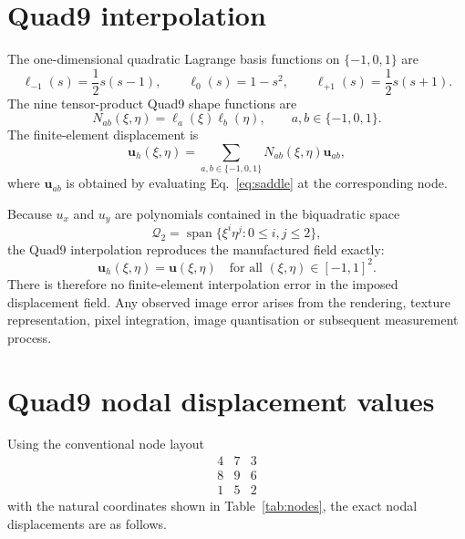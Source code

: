 \documentclass[11pt,a4paper]{article}
\newcommand{\vect}[1]{\bm{#1}}
\begin{document}
\section{Quad9 interpolation}

The one-dimensional quadratic Lagrange basis functions on $\{-1,0,1\}$ are
\begin{equation}
  \ell_{-1}(s)=\frac{1}{2}s(s-1),
  \qquad
  \ell_0(s)=1-s^2,
  \qquad
  \ell_{+1}(s)=\frac{1}{2}s(s+1).
\end{equation}
The nine tensor-product Quad9 shape functions are
\begin{equation}
  N_{ab}(\xi,\eta)=\ell_a(\xi)\ell_b(\eta),
  \qquad a,b\in\{-1,0,1\}.
\end{equation}
The finite-element displacement is
\begin{equation}
  \vect{u}_h(\xi,\eta)
  =\sum_{a,b\in\{-1,0,1\}}
  N_{ab}(\xi,\eta)\vect{u}_{ab},
\end{equation}
where $\vect{u}_{ab}$ is obtained by evaluating Eq.~\eqref{eq:saddle} at the corresponding node.

Because $u_x$ and $u_y$ are polynomials contained in the biquadratic space
\begin{equation}
  \mathcal{Q}_2
  =\operatorname{span}\{\xi^i\eta^j:0\le i,j\le2\},
\end{equation}
the Quad9 interpolation reproduces the manufactured field exactly:
\begin{equation}
  \boxed{\vect{u}_h(\xi,\eta)=\vect{u}(\xi,\eta)
  \quad\text{for all }(\xi,\eta)\in[-1,1]^2.}
\end{equation}
There is therefore no finite-element interpolation error in the imposed displacement field. Any observed image error arises from the rendering, texture representation, pixel integration, image quantisation or subsequent measurement process.

\section{Quad9 nodal displacement values}

Using the conventional node layout
\[
\begin{array}{ccc}
4&7&3\\
8&9&6\\
1&5&2
\end{array}
\]
with the natural coordinates shown in Table~\ref{tab:nodes}, the exact nodal displacements are as follows.
\end{document}
